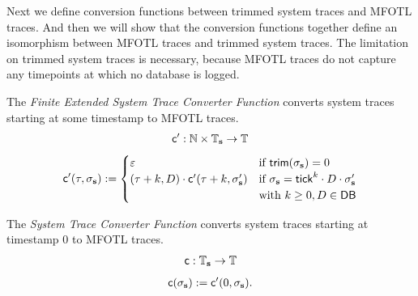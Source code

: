 Next we define conversion functions between trimmed
system traces and MFOTL traces.
And then we will show that the conversion functions
together define an isomorphism between
MFOTL traces and trimmed system traces.
The limitation on trimmed system traces is necessary,
because MFOTL traces do not capture any timepoints at
which no database is logged.
\begin{definition}
    \vspace{-1em}
    \label{def:cconv'}
    The \emph{Finite Extended System Trace Converter Function} converts system
    traces starting at some timestamp to MFOTL traces.
    \begin{align*}
        \mathsf{c}':
        \mathbb{N} \times \mathbb{T}_{\mathbf{s}}
        \to \mathbb{T}
    \end{align*}
    \vspace{-2em}
    \begin{align*}
        \mathsf{c}'(\tau, \sigma_{\mathbf{s}}) :=
        \begin{cases}
            \varepsilon
                & \text{if } \mathsf{trim}(\sigma_{\mathbf{s}}) = 0 \\
            (\tau + k, D) \cdot \mathsf{c}'(\tau+k, \sigma'_{\mathbf{s}})
                & \text{if } \sigma_{\mathbf{s}} = \mathsf{tick}^k \cdot D \cdot \sigma'_{\mathbf{s}} \\
                & \text{with } k \geq 0, D \in \mathsf{DB} \\
        \end{cases}
    \end{align*}
\end{definition}

\begin{definition}
    \label{def:cconv}
    The \emph{System Trace Converter Function} converts system
    traces starting at timestamp $0$ to MFOTL traces.
    \vspace{-1em}
    \begin{equation*}
        \mathsf{c}: \mathbb{T}_{\mathbf{s}} \to \mathbb{T}
    \end{equation*}
    \vspace{-2em}
    \begin{align*}
        \mathsf{c}(\sigma_{\mathbf{s}}) := \mathsf{c}'(0, \sigma_{\mathbf{s}}).
    \end{align*}
\end{definition}


